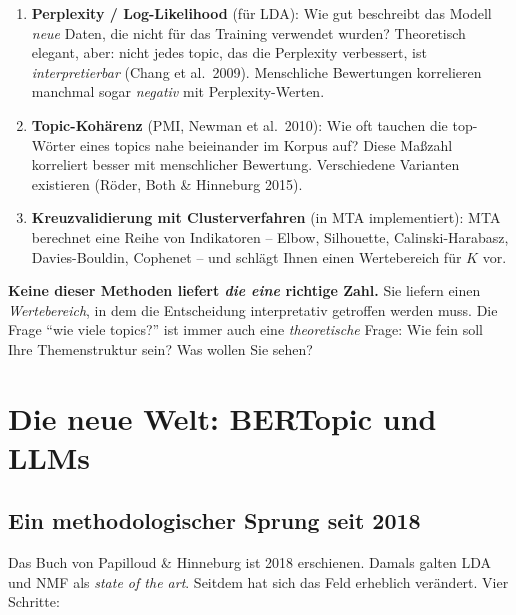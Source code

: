 \documentclass[a4paper,11pt]{article}
\begin{document}
\begin{enumerate}
\item \textbf{Perplexity / Log-Likelihood} (für LDA): Wie gut beschreibt
das Modell \emph{neue} Daten, die nicht für das Training verwendet
wurden? Theoretisch elegant, aber: nicht jedes topic, das die
Perplexity verbessert, ist \emph{interpretierbar} (Chang et al.\ 2009).
Menschliche Bewertungen korrelieren manchmal sogar \emph{negativ}
mit Perplexity-Werten.

\item \textbf{Topic-Kohärenz} (PMI, Newman et al.\ 2010): Wie oft
tauchen die top-Wörter eines topics nahe beieinander im Korpus auf?
Diese Maßzahl korreliert besser mit menschlicher Bewertung. Verschiedene
Varianten existieren (Röder, Both \& Hinneburg 2015).

\item \textbf{Kreuzvalidierung mit Clusterverfahren} (in MTA
implementiert): MTA berechnet eine Reihe von Indikatoren -- Elbow,
Silhouette, Calinski-Harabasz, Davies-Bouldin, Cophenet -- und schlägt
Ihnen einen Wertebereich für $K$ vor.
\end{enumerate}

\begin{merkbox}
\textbf{Keine dieser Methoden liefert \emph{die eine} richtige Zahl.}
Sie liefern einen \emph{Wertebereich}, in dem die Entscheidung
interpretativ getroffen werden muss. Die Frage \enquote{wie viele
topics?} ist immer auch eine \emph{theoretische} Frage: Wie fein
soll Ihre Themenstruktur sein? Was wollen Sie sehen?
\end{merkbox}

\section{Die neue Welt: BERTopic und LLMs}

\subsection{Ein methodologischer Sprung seit 2018}

Das Buch von Papilloud \& Hinneburg ist 2018 erschienen. Damals
galten LDA und NMF als \emph{state of the art}. Seitdem hat sich das
Feld erheblich verändert. Vier Schritte:
\end{document}
